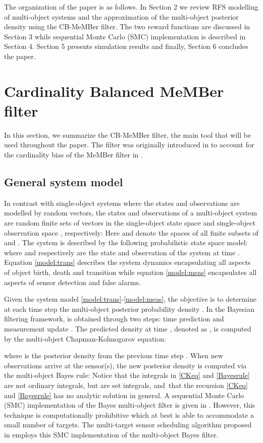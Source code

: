 \documentclass[twocolumn]{autart}
\begin{document}
The organization of the paper is as follows. In Section 2 we review RFS
modelling of multi-object systems and the approximation of the multi-object
posterior density using the CB-MeMBer filter. The two reward functions are
discussed in Section 3 while sequential Monte Carlo (SMC) implementation is
described in Section 4. Section 5 presents simulation results and finally,
Section 6 concludes the paper.



\section{Cardinality Balanced MeMBer filter}

In this section, we summarize the CB-MeMBer filter, the main tool that will
be used throughout the paper. The filter was originally introduced in \cite {VVC09} to account for the cardinality bias of the MeMBer filter in \cite {Mah07}.

\subsection{General system model}

In contrast with single-object systems where the states and observations are
modelled by random vectors, the states and observations of a multi-object
system are random finite sets of vectors in the single-object state space  and single-object observation space
, respectively:
Here  and  denote the
spaces of all finite subsets of  and . The system is described by the following
probabilistic state space model:
where  and  respectively are the state and
observation of the system at time . Equation \eqref{model:trans}
describes the system dynamics encapsulating all aspects of object birth,
death and transition while equation \eqref{model:meas} encapsulates all aspects of sensor
detection and false alarms.

Given the system model \eqref{model:trans}-\eqref{model:meas}, the objective
is to determine at each time step  the multi-object posterior probability
density . In the Bayesian filtering
framework,  is obtained through two
steps: time prediction and measurement update \cite{Mah07}. The predicted
density at time  , denoted as , is computed by the multi-object Chapman-Kolmogorov equation:

where  is the posterior
density from the previous time step . When new observations arrive at
the sensor(s), the new posterior density is computed via the multi-object
Bayes rule:
Notice that the integrals in \eqref{CKeq} and \eqref{Bayesrule} are not
ordinary integrals, but are set integrals, and\ that the recursion \eqref{CKeq} and \eqref{Bayesrule} has no analytic solution in general. A
sequential Monte Carlo (SMC) implementation of the Bayes multi-object filter
is given in \cite{VoAES}. However, this technique is computationally
prohibitive which at best is able to accommodate a small number of targets.
The multi-target sensor scheduling algorithm proposed in \cite{RV10} employs
this SMC implementation of the multi-object Bayes filter.
\end{document}
